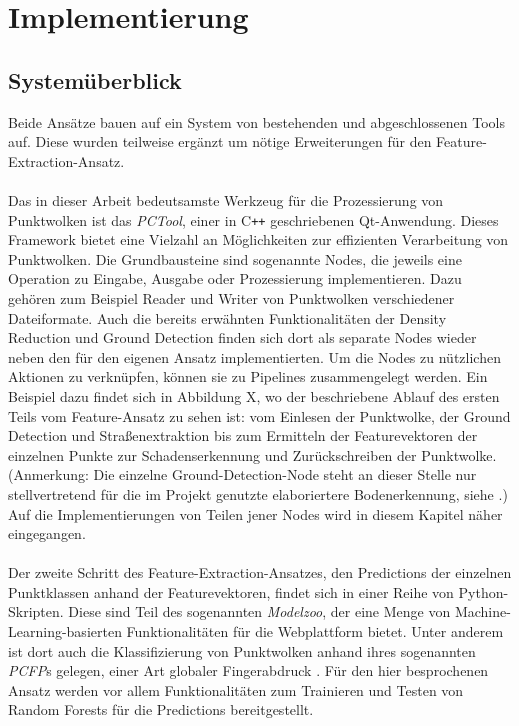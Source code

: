
\chapter{Implementierung}


\section{Systemüberblick}

Beide Ansätze bauen auf ein System von bestehenden und abgeschlossenen Tools auf. Diese wurden teilweise ergänzt um nötige Erweiterungen für den Feature-Extraction-Ansatz. \\\\
Das in dieser Arbeit bedeutsamste Werkzeug für die Prozessierung von Punktwolken ist das \textit{PCTool}, einer in C\texttt{++} geschriebenen Qt-Anwendung. Dieses Framework bietet eine Vielzahl an Möglichkeiten zur effizienten Verarbeitung von Punktwolken. Die Grundbausteine sind sogenannte Nodes, die jeweils eine Operation zu Eingabe, Ausgabe oder Prozessierung implementieren. Dazu gehören zum Beispiel Reader und Writer von Punktwolken verschiedener Dateiformate. Auch die bereits erwähnten Funktionalitäten der Density Reduction und Ground Detection finden sich dort als separate Nodes wieder neben den für den eigenen Ansatz implementierten. Um die Nodes zu nützlichen Aktionen zu verknüpfen, können sie zu Pipelines zusammengelegt werden. Ein Beispiel dazu findet sich in Abbildung X, wo der beschriebene Ablauf des ersten Teils vom Feature-Ansatz zu sehen ist: vom Einlesen der Punktwolke, der Ground Detection und Straßenextraktion bis zum Ermitteln der Featurevektoren der einzelnen Punkte zur Schadenserkennung und Zurückschreiben der Punktwolke. (Anmerkung: Die einzelne Ground-Detection-Node steht an dieser Stelle nur stellvertretend für die im Projekt genutzte elaboriertere Bodenerkennung, siehe \cite{Mattes-2021}.) Auf die Implementierungen von Teilen jener Nodes wird in diesem Kapitel näher eingegangen. \\\\
Der zweite Schritt des Feature-Extraction-Ansatzes, den Predictions der einzelnen Punktklassen anhand der Featurevektoren, findet sich in einer Reihe von Python-Skripten. Diese sind Teil des sogenannten \textit{Modelzoo}, der eine Menge von Machine-Learning-basierten Funktionalitäten für die Webplattform \citep{Schilling-2021} bietet. Unter anderem ist dort auch die Klassifizierung von Punktwolken anhand ihres sogenannten \textit{PCFP}s gelegen, einer Art globaler Fingerabdruck \citep{Kirsten-2021}. Für den hier besprochenen Ansatz werden vor allem Funktionalitäten zum Trainieren und Testen von Random Forests für die Predictions bereitgestellt. \\\\
